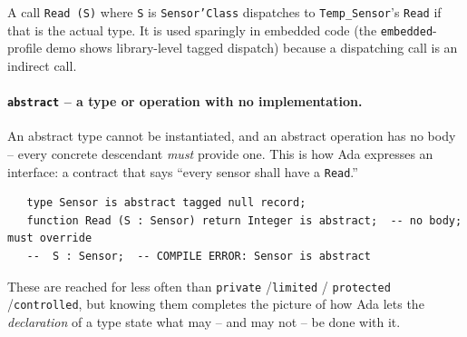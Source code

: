 A call \texttt{Read (S)} where \texttt{S} is \texttt{Sensor'Class} dispatches to
\texttt{Temp\_Sensor}'s \texttt{Read} if that is the actual type. It is used
sparingly in embedded code (the \texttt{embedded}-profile demo shows library-level
tagged dispatch) because a dispatching call is an indirect call.

\paragraph{\texttt{abstract} -- a type or operation with no implementation.} An
abstract type cannot be instantiated, and an abstract operation has no body --
every concrete descendant \emph{must} provide one. This is how Ada expresses an
interface: a contract that says ``every sensor shall have a \texttt{Read}.''

\begin{lstlisting}
   type Sensor is abstract tagged null record;
   function Read (S : Sensor) return Integer is abstract;  -- no body; must override
   --  S : Sensor;  -- COMPILE ERROR: Sensor is abstract
\end{lstlisting}

These are reached for less often than \texttt{private} /\texttt{limited} /
\texttt{protected} /\texttt{controlled}, but knowing them completes the picture of
how Ada lets the \emph{declaration} of a type state what may -- and may not -- be
done with it.
